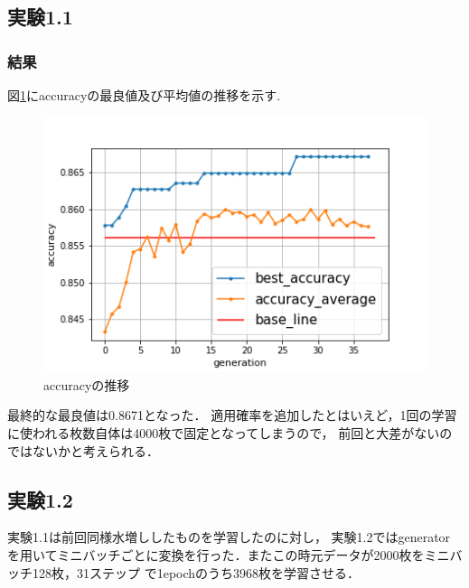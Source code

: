 \documentclass[twocolumn]{jarticle}     %
\begin{document}
\subsection{実験1.1}
\subsubsection{結果}
図\ref{fig:graph1}にaccuracyの最良値及び平均値の推移を示す.
\begin{figure}[hp]
	\centering
	\includegraphics[scale=0.6]{graph1.png}
	\caption{accuracyの推移\label{fig:graph1}}
\end{figure}
最終的な最良値は0.8671となった．
適用確率を追加したとはいえど，1回の学習に使われる枚数自体は4000枚で固定となってしまうので，
前回と大差がないのではないかと考えられる．


\subsection{実験1.2}
実験1.1は前回同様水増ししたものを学習したのに対し，
実験1.2ではgeneratorを用いてミニバッチごとに変換を行った．またこの時元データが2000枚をミニバッチ128枚，31ステップ
で1epochのうち3968枚を学習させる．
\end{document}
